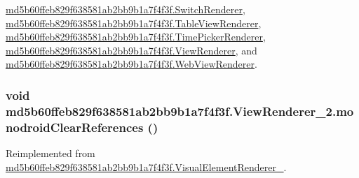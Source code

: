 \hyperlink{classmd5b60ffeb829f638581ab2bb9b1a7f4f3f_1_1_switch_renderer_028e2f4c76a4c1f2172e7e22c873f457}{md5b60ffeb829f638581ab2bb9b1a7f4f3f.SwitchRenderer}, \hyperlink{classmd5b60ffeb829f638581ab2bb9b1a7f4f3f_1_1_table_view_renderer_f259e91ecf2a98fa15f6cfa21ba30c72}{md5b60ffeb829f638581ab2bb9b1a7f4f3f.TableViewRenderer}, \hyperlink{classmd5b60ffeb829f638581ab2bb9b1a7f4f3f_1_1_time_picker_renderer_09ae55d639cff012f899b5f0d3854c43}{md5b60ffeb829f638581ab2bb9b1a7f4f3f.TimePickerRenderer}, \hyperlink{classmd5b60ffeb829f638581ab2bb9b1a7f4f3f_1_1_view_renderer_9ce576208d6e67c5201f21b67a8baf34}{md5b60ffeb829f638581ab2bb9b1a7f4f3f.ViewRenderer}, and \hyperlink{classmd5b60ffeb829f638581ab2bb9b1a7f4f3f_1_1_web_view_renderer_395da0b1470b8a8d7fe3d8f11678dd44}{md5b60ffeb829f638581ab2bb9b1a7f4f3f.WebViewRenderer}.\hypertarget{classmd5b60ffeb829f638581ab2bb9b1a7f4f3f_1_1_view_renderer__2_dae20979ac761a65aa60c9b427509c37}{
\subsubsection[{monodroidClearReferences}]{\setlength{\rightskip}{0pt plus 5cm}void md5b60ffeb829f638581ab2bb9b1a7f4f3f.ViewRenderer\_\-2.monodroidClearReferences ()}}
\label{classmd5b60ffeb829f638581ab2bb9b1a7f4f3f_1_1_view_renderer__2_dae20979ac761a65aa60c9b427509c37}




Reimplemented from \hyperlink{classmd5b60ffeb829f638581ab2bb9b1a7f4f3f_1_1_visual_element_renderer__1_4a1c180026d8eab71549e47b7de4b9b8}{md5b60ffeb829f638581ab2bb9b1a7f4f3f.VisualElementRenderer\_}.

